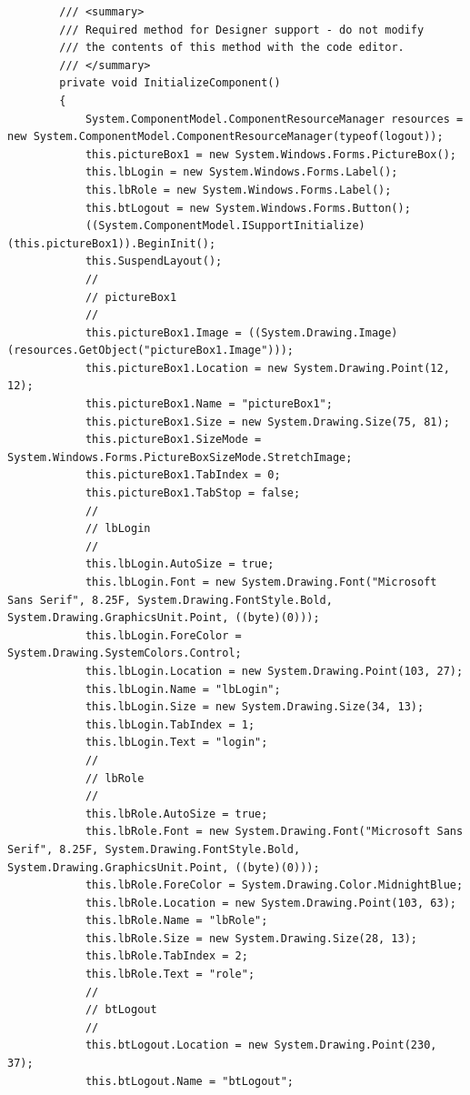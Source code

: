 \documentclass[main.tex]{subfiles}
\begin{document}
\begin{lstlisting}
        /// <summary>
        /// Required method for Designer support - do not modify
        /// the contents of this method with the code editor.
        /// </summary>
        private void InitializeComponent()
        {
            System.ComponentModel.ComponentResourceManager resources = new System.ComponentModel.ComponentResourceManager(typeof(logout));
            this.pictureBox1 = new System.Windows.Forms.PictureBox();
            this.lbLogin = new System.Windows.Forms.Label();
            this.lbRole = new System.Windows.Forms.Label();
            this.btLogout = new System.Windows.Forms.Button();
            ((System.ComponentModel.ISupportInitialize)(this.pictureBox1)).BeginInit();
            this.SuspendLayout();
            // 
            // pictureBox1
            // 
            this.pictureBox1.Image = ((System.Drawing.Image)(resources.GetObject("pictureBox1.Image")));
            this.pictureBox1.Location = new System.Drawing.Point(12, 12);
            this.pictureBox1.Name = "pictureBox1";
            this.pictureBox1.Size = new System.Drawing.Size(75, 81);
            this.pictureBox1.SizeMode = System.Windows.Forms.PictureBoxSizeMode.StretchImage;
            this.pictureBox1.TabIndex = 0;
            this.pictureBox1.TabStop = false;
            // 
            // lbLogin
            // 
            this.lbLogin.AutoSize = true;
            this.lbLogin.Font = new System.Drawing.Font("Microsoft Sans Serif", 8.25F, System.Drawing.FontStyle.Bold, System.Drawing.GraphicsUnit.Point, ((byte)(0)));
            this.lbLogin.ForeColor = System.Drawing.SystemColors.Control;
            this.lbLogin.Location = new System.Drawing.Point(103, 27);
            this.lbLogin.Name = "lbLogin";
            this.lbLogin.Size = new System.Drawing.Size(34, 13);
            this.lbLogin.TabIndex = 1;
            this.lbLogin.Text = "login";
            // 
            // lbRole
            // 
            this.lbRole.AutoSize = true;
            this.lbRole.Font = new System.Drawing.Font("Microsoft Sans Serif", 8.25F, System.Drawing.FontStyle.Bold, System.Drawing.GraphicsUnit.Point, ((byte)(0)));
            this.lbRole.ForeColor = System.Drawing.Color.MidnightBlue;
            this.lbRole.Location = new System.Drawing.Point(103, 63);
            this.lbRole.Name = "lbRole";
            this.lbRole.Size = new System.Drawing.Size(28, 13);
            this.lbRole.TabIndex = 2;
            this.lbRole.Text = "role";
            // 
            // btLogout
            // 
            this.btLogout.Location = new System.Drawing.Point(230, 37);
            this.btLogout.Name = "btLogout";

\end{lstlisting}
\end{document}
